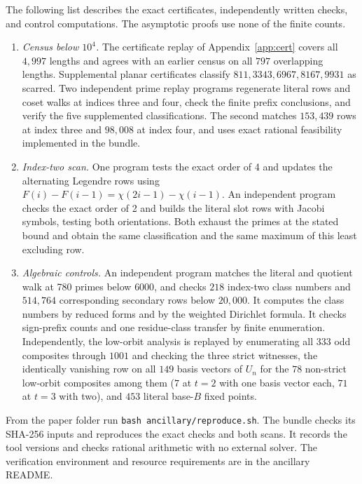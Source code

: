 \documentclass[11pt,reqno]{amsart}
\begin{document}
The following list describes the exact certificates, independently written checks, and control computations. The asymptotic proofs use none of the finite counts.
\begin{enumerate}
\item \emph{Census below \(10^4\).} The certificate replay of Appendix~\ref{app:cert} covers all \(4{,}997\) lengths and agrees with an earlier census on all \(797\) overlapping lengths. Supplemental planar certificates classify \(811,3343,6967,8167,9931\) as scarred. Two independent prime replay programs regenerate literal rows and coset walks at indices three and four, check the finite prefix conclusions, and verify the five supplemented classifications. The second matches \(153{,}439\) rows at index three and \(98{,}008\) at index four, and uses exact rational feasibility implemented in the bundle.
\item \emph{Index-two scan.} One program tests the exact order of 4 and updates the alternating Legendre rows using \(F(i)-F(i-1)=\chi(2i-1)-\chi(i-1)\). An independent program checks the exact order of 2 and builds the literal slot rows with Jacobi symbols, testing both orientations. Both exhaust the primes at the stated bound and obtain the same classification and the same maximum of this least excluding row.
\item \emph{Algebraic controls.} An independent program matches the literal and quotient walk at 780 primes below \(6000\), and checks \(218\) index-two class numbers and \(514{,}764\) corresponding secondary rows below \(20{,}000\). It computes the class numbers by reduced forms and by the weighted Dirichlet formula. It checks sign-prefix counts and one residue-class transfer by finite enumeration. Independently, the low-orbit analysis is replayed by enumerating all \(333\) odd composites through \(1001\) and checking the three strict witnesses, the identically vanishing row on all \(149\) basis vectors of \(U_n\) for the \(78\) non-strict low-orbit composites among them (\(7\) at \(t=2\) with one basis vector each, \(71\) at \(t=3\) with two), and \(453\) literal base-\(B\) fixed points.
\end{enumerate}
From the paper folder run \texttt{bash ancillary/reproduce.sh}. The bundle checks its SHA-256 inputs and reproduces the exact checks and both scans. It records the tool versions and checks rational arithmetic with no external solver. The verification environment and resource requirements are in the ancillary README.
\end{document}
